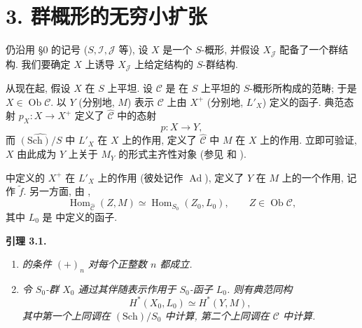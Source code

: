 
\setcounter{footnote}{64}

\section*{3. 群概形的无穷小扩张}

仍沿用 \S0 的记号 (\(S,\mathscr I,\mathscr J\) 等),
设 \(X\) 是一个 \(S\)-概形, 并假设 \(X_{\mathscr J}\)
配备了一个群结构. 我们要确定 \(X\) 上诱导 \(X_{\mathscr J}\)
上给定结构的 \(S\)-群结构.

从现在起, 假设 \(X\) 在 \(S\) 上平坦. 设 \(\mathscr C\) 是
在 \(S\) 上平坦的 \(S\)-概形所构成的范畴;
于是 \(X\in\operatorname{Ob}\mathscr C\).
以 \(Y\) (分别地, \(M\)) 表示 \(\mathscr C\) 上由
\(X^+\) (分别地, \(L'_X\)) 定义的函子.
典范态射 \(p_X:X\to X^+\) 定义了 \(\widehat{\mathscr C}\) 中的态射
\[
 p:X\longrightarrow Y,
\]
而 \(\widehat{(\mathrm{Sch})/S}\) 中 \(L'_X\) 在 \(X\) 上的作用,
定义了 \(\widehat{\mathscr C}\) 中 \(M\) 在 \(X\) 上的作用.
立即可验证, \(X\) 由此成为 \(Y\) 上关于 \(M_Y\) 的形式主齐性对象
(参见  和
).

 中定义的 \(X^+\) 在
\(L'_X\) 上的作用 (彼处记作 \(\operatorname{Ad}\)),
定义了 \(Y\) 在 \(M\) 上的一个作用, 记作 \(\widetilde f\).
另一方面, 由 ,
\[
 \operatorname{Hom}_{\widehat{\mathscr C}}(Z,M)
 \simeq \operatorname{Hom}_{S_0}(Z_0,L_0),
 \qquad Z\in\operatorname{Ob}\mathscr C,
\]
其中 \(L_0\) 是  中定义的函子.

\medskip
\noindent{}\textbf{引理 3.1.}
\begin{enumerate}
\item[(i)] \textit{ 的条件
\((+)_{n}\) 对每个正整数 \(n\) 都成立.}
\item[\SGAInlineRefTarget{sga3:iii:lemma:3-1:item:ii}(ii)]
\textit{令 \(S_0\)-群 \(X_0\) 通过其伴随表示作用于
\(S_0\)-函子 \(L_0\). 则有典范同构}
\[
 H^*(X_0,L_0)\simeq H^*(Y,M),
\]
\textit{其中第一个上同调在 \((\mathrm{Sch})/S_0\) 中计算,
第二个上同调在 \(\mathscr C\) 中计算.}
\end{enumerate}

